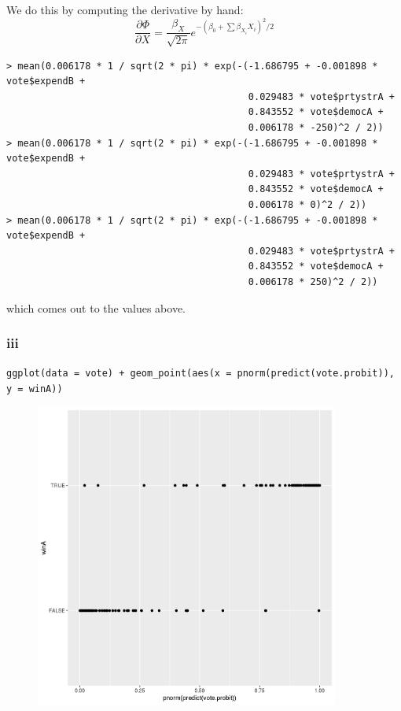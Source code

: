 \documentclass[12pt,letterpaper]{article}
\theoremstyle{definition}
\begin{document}
We do this by computing the derivative by hand:
\[
  \frac{\partial \Phi}{\partial X} = \frac{\beta_{X}}{\sqrt{2\pi}}e^{-(\beta_{0} + \sum \beta_{X_{i}}X_{i})^{2}/2}
\]
\begin{Verbatim}[fontsize=\small]
> mean(0.006178 * 1 / sqrt(2 * pi) * exp(-(-1.686795 + -0.001898 * vote$expendB +
                                           0.029483 * vote$prtystrA +
                                           0.843552 * vote$democA +
                                           0.006178 * -250)^2 / 2))
> mean(0.006178 * 1 / sqrt(2 * pi) * exp(-(-1.686795 + -0.001898 * vote$expendB +
                                           0.029483 * vote$prtystrA +
                                           0.843552 * vote$democA +
                                           0.006178 * 0)^2 / 2))
> mean(0.006178 * 1 / sqrt(2 * pi) * exp(-(-1.686795 + -0.001898 * vote$expendB +
                                           0.029483 * vote$prtystrA +
                                           0.843552 * vote$democA +
                                           0.006178 * 250)^2 / 2))
\end{Verbatim}
which comes out to the values above.

\subsubsection*{iii}

\verb|ggplot(data = vote) + geom_point(aes(x = pnorm(predict(vote.probit)), y = winA))|
\begin{figure}[H]
  \begin{center}
    \includegraphics*[width=10cm]{2biii.png}
  \end{center}
\end{figure}
\end{document}
